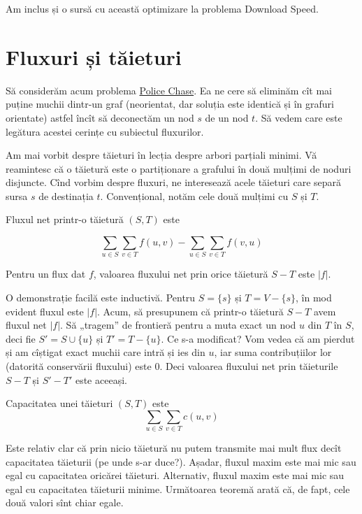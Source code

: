 \documentclass[../main.tex]{subfiles}
\begin{document}
Am inclus și o sursă cu această optimizare la problema Download Speed.

\section{Fluxuri și tăieturi}

Să considerăm acum problema \hyperref[problem:police-chase]{Police Chase}. Ea ne cere să eliminăm cît mai puține muchii dintr-un graf (neorientat, dar soluția este identică și în grafuri orientate) astfel încît să deconectăm un nod $s$ de un nod $t$. Să vedem care este legătura acestei cerințe cu subiectul fluxurilor.

Am mai vorbit despre tăieturi în lecția despre arbori parțiali minimi. Vă reamintesc că o tăietură este o partiționare a grafului în două mulțimi de noduri disjuncte. Cînd vorbim despre fluxuri, ne interesează acele tăieturi care separă sursa $s$ de destinația $t$. Convențional, notăm cele două mulțimi cu $S$ și $T$.

\begin{definition}
  Fluxul net printr-o tăietură $(S, T)$ este

  $$\sum_{u \in S} \sum_{v \in T} f(u, v) - \sum_{u \in S} \sum_{v \in T} f(v, u)$$
\end{definition}

\begin{theorem}
  Pentru un flux dat $f$, valoarea fluxului net prin orice tăietură $S-T$ este $|f|$.
\end{theorem}

O demonstrație facilă este inductivă. Pentru $S=\{s\}$ și $T=V-\{s\}$, în mod evident fluxul este $|f|$. Acum, să presupunem că printr-o tăietură $S-T$ avem fluxul net $|f|$. Să „tragem” de frontieră pentru a muta exact un nod $u$ din $T$ în $S$, deci fie $S' = S \cup \{u\}$ și $T' = T - \{u\}$. Ce s-a modificat? Vom vedea că am pierdut și am cîștigat exact muchii care intră și ies din $u$, iar suma contribuțiilor lor (datorită conservării fluxului) este 0. Deci valoarea fluxului net prin tăieturile $S-T$ și $S'-T'$ este aceeași.

\begin{definition}
  Capacitatea unei tăieturi $(S, T)$ este $$\sum_{u \in S} \sum_{v \in T} c(u, v)$$
\end{definition}

Este relativ clar că prin nicio tăietură nu putem transmite mai mult flux decît capacitatea tăieturii (pe unde s-ar duce?). Așadar, fluxul maxim este mai mic sau egal cu capacitatea oricărei tăieturi. Alternativ, fluxul maxim este mai mic sau egal cu capacitatea tăieturii minime. Următoarea teoremă arată că, de fapt, cele două valori sînt chiar egale.
\end{document}
